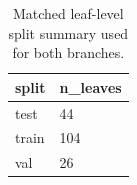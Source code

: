 \begin{table}[t]
\centering
\caption{Matched leaf-level split summary used for both branches.}
\label{tab:splits}
\scriptsize
\begin{tabular}{ll}
\toprule
split & n\_leaves \\
\midrule
test & 44 \\
train & 104 \\
val & 26 \\
\bottomrule
\end{tabular}
\end{table}
